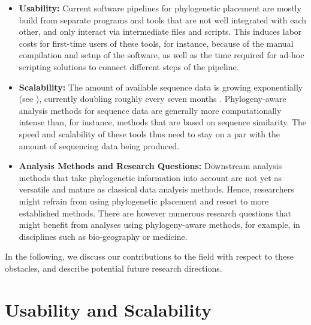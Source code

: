 \begin{itemize}
    \item \textbf{Usability:}
          Current software pipelines for phylogenetic placement are mostly build from separate programs and tools
          that are not well integrated with each other, and only interact via intermediate files and scripts.
          This induces labor costs for first-time users of these tools,
          for instance, because of the manual compilation and setup of the software,
          as well as the time required for ad-hoc scripting solutions to connect different steps of the pipeline.
    \item \textbf{Scalability:}
          The amount of available sequence data is growing exponentially (see ),
          currently doubling roughly every seven months \cite{Stephens2015}.
          Phylogeny-aware analysis methods for sequence data are generally more computationally intense than, for instance,
          methods that are based on sequence similarity.
          The speed and scalability of these tools thus
          need to stay on a par with the amount of sequencing data being produced.
    \item \textbf{Analysis Methods and Research Questions:}
          Downstream analysis methods that take phylogenetic information into account
          are not yet as versatile and mature as classical data analysis methods.
          Hence, researchers might refrain from using phylogenetic placement and resort to more established methods.
          There are however numerous research questions that might benefit from analyses using phylogeny-aware methods,
          for example, in disciplines such as bio-geography or medicine.
\end{itemize}

In the following, we discuss our contributions to the field with respect to these obstacles,
and describe potential future research directions.


\section{Usability and Scalability}
\label{ch:ConclusionOutlook:sec:UsabilityScalability}


